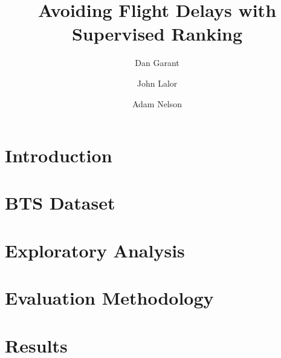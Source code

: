 \documentclass{article}
\title{Avoiding Flight Delays with Supervised Ranking}
\author{Dan Garant \and John Lalor \and Adam Nelson}
\date{}
\begin{document}
\begin{abstract}

\end{abstract}

\section{Introduction}

\section{BTS Dataset}

\section{Exploratory Analysis}

\section{Evaluation Methodology}

\section{Results}
\end{document}
